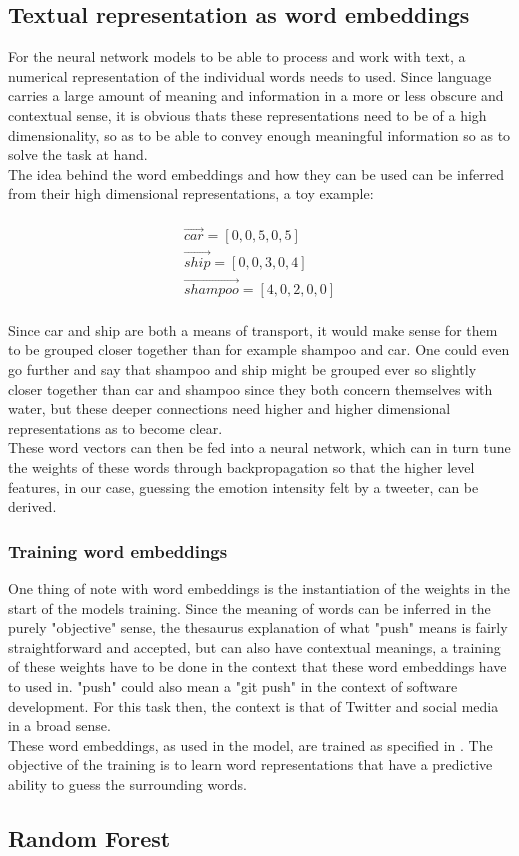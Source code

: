 \subsection{Textual representation as word embeddings}
For the neural network models to be able to process and work with text, a numerical representation of the individual words needs to used. Since language carries a large amount of meaning and information in a more or less obscure and contextual sense, it is obvious thats these representations need to be of a high dimensionality, so as to be able to convey enough meaningful information so as to solve the task at hand.\\
The idea behind the word embeddings and how they can be used can be inferred from their high dimensional representations, a toy example:\\
\\
\begin{equation}
\begin{aligned}
\vec{car} = [0,0,5,0,5]\\
\vec{ship} = [0,0,3,0,4]\\
\vec{shampoo} = [4,0,2,0,0]
\end{aligned}
\end{equation}\\
Since car and ship are both a means of transport, it would make sense for them to be grouped closer together than for example shampoo and car. One could even go further and say that shampoo and ship might be grouped ever so slightly closer together than car and shampoo since they both concern themselves with water, but these deeper connections need higher and higher dimensional representations as to become clear.\\
These word vectors can then be fed into a neural network, which can in turn tune the weights of these words through backpropagation so that the higher level features, in our case, guessing the emotion intensity felt by a tweeter, can be derived.

\subsubsection{Training word embeddings}
One thing of note with word embeddings is the instantiation of the weights in the start of the models training. Since the meaning of words can be inferred in the purely "objective" sense, the thesaurus explanation of what "push" means is fairly straightforward and accepted, but can also have contextual meanings, a training of these weights have to be done in the context that these word embeddings have to used in. "push" could also mean a "git push" in the context of software development. For this task then, the context is that of Twitter and social media in a broad sense.\\
These word embeddings, as used in the model, are trained as specified in \cite{mikolov}. The objective of the training is to learn word representations that have a predictive ability to guess the surrounding words. 

\subsection{Random Forest}